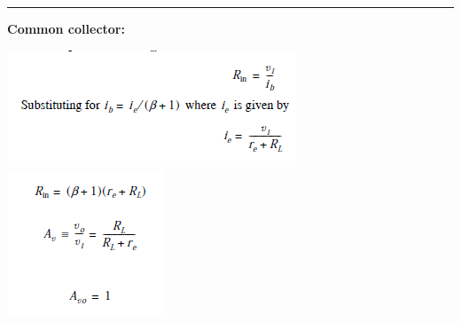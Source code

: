 \documentclass[a4paper]{article}
\newcommand{\hrl}{
    \vspace{2mm}
    \hrule
    \vspace{2mm}
}
\begin{document}
\begin{multicols}{3}
\hrl 
\textbf{Common collector:}

\includegraphics[width=\linewidth]{imgs/21}
\includegraphics[width=\linewidth]{imgs/22}

\end{multicols}
\end{document}
